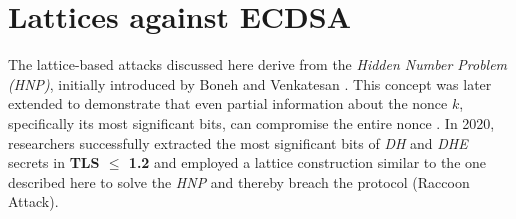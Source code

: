 \documentclass[a4paper,12pt]{report}
\begin{document}
\section{Lattices against ECDSA}

The lattice-based attacks discussed here derive from the \textit{Hidden Number Problem (HNP)}, initially introduced by Boneh and Venkatesan \cite{hnp}. This concept was later extended to demonstrate that even partial information about the nonce $k$, specifically its most significant bits, can compromise the entire nonce \cite{ecdsa_nonce}. In 2020, researchers successfully extracted the most significant bits of \textit{DH} and \textit{DHE} secrets in \textbf{TLS $\le$ 1.2} and employed a lattice construction similar to the one described here to solve the \textit{HNP} and thereby breach the protocol \cite{cryptoeprint:2020:1151} (Raccoon Attack).
\end{document}
